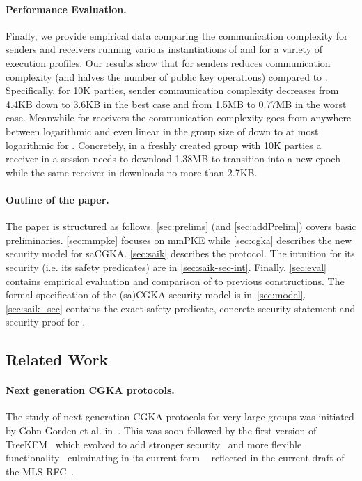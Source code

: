 \paragraph{Performance Evaluation.}
Finally, we provide empirical data comparing the communication complexity for
senders and receivers running various instantiations of \saik and \protITK
for a variety of execution profiles. Our results show that for senders \saik
reduces communication complexity (and halves the number of public key
operations) compared to \protITK. Specifically, for 10K parties, sender
communication complexity decreases from 4.4KB down to 3.6KB in the best case
and from 1.5MB to 0.77MB in the worst case. Meanwhile for receivers the
communication complexity goes from anywhere between logarithmic and even
linear in the group size of \protITK down to at most logarithmic for \saik. Concretely, in a freshly created group with
10K parties a receiver in a \protITK session needs to download 1.38MB to transition into a
new epoch while the same receiver in \saik downloads no more than 2.7KB.

\paragraph{Outline of the paper.}
The paper is structured as follows. \cref{sec:prelims}
(and \cref{sec:addPrelim}) covers basic preliminaries. \cref{sec:mmpke}
focuses on mmPKE while \cref{sec:cgka} describes the new security model for
saCGKA. \cref{sec:saik} describes the \saik protocol.
The intuition for its security (i.e. its safety predicates) are in
\cref{sec:saik-sec-int}. Finally, \cref{sec:eval} contains empirical
evaluation and comparison of \saik to previous constructions.
The formal specification of the (sa)CGKA security
model is in~\cref{sec:model}. \cref{sec:saik_sec} contains the exact
safety predicate, concrete security statement and security proof for \saik.

\subsection{Related Work}

\paragraph{Next generation CGKA protocols.}
The study of next generation CGKA protocols for very large groups was
initiated by Cohn-Gorden et al. in~\cite{CCS:CCGMM18}. This was soon followed
by the first version of TreeKEM~\cite{TreeKEM-original-email} which
evolved to add stronger
security~\cite{TreeKEM-original-email,TreeKEM-with-blanking-email,TreeKEM-tree-signing-email}
and more flexible functionality~\cite{TreeKEM-prop-and-comm-email}
culminating in its current form \protITK{}~\cite{EPRINT:AlwJosMul20}
reflected in the current draft of the MLS RFC~\cite{mls-protocol-latest}.

